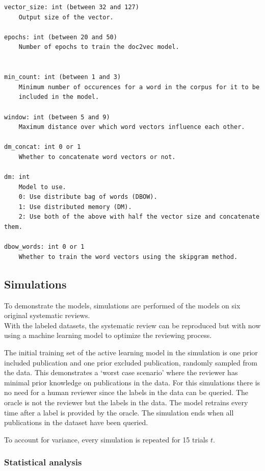 \documentclass[
]{article}
\begin{document}
\begin{verbatim}
vector_size: int (between 32 and 127)
    Output size of the vector.

epochs: int (between 20 and 50)
    Number of epochs to train the doc2vec model.


min_count: int (between 1 and 3)
    Minimum number of occurences for a word in the corpus for it to be 
    included in the model.

window: int (between 5 and 9)
    Maximum distance over which word vectors influence each other.

dm_concat: int 0 or 1
    Whether to concatenate word vectors or not.
                 
dm: int 
    Model to use.
    0: Use distribute bag of words (DBOW).
    1: Use distributed memory (DM).
    2: Use both of the above with half the vector size and concatenate them.

dbow_words: int 0 or 1
    Whether to train the word vectors using the skipgram method.
\end{verbatim}

\hypertarget{simulations}{%
\subsection{Simulations}\label{simulations}}

To demonstrate the models, simulations are performed of the models on
six original systematic reviews.\\
With the labeled datasets, the systematic review can be reproduced but
with now using a machine learning model to optimize the reviewing
process.

The initial training set of the active learning model in the simulation
is one prior included publication and one prior excluded publication,
randomly sampled from the data. This demonstrates a `worst case
scenario' where the reviewer has minimal prior knowledge on publications
in the data. For this simulations there is no need for a human reviewer
since the labels in the data can be queried. The oracle is not the
reviewer but the labels in the data. The model retrains every time after
a label is provided by the oracle. The simulation ends when all
publications in the dataset have been queried.

To account for variance, every simulation is repeated for 15 trials
\(t\).

\hypertarget{statistical-analysis}{%
\subsubsection{Statistical analysis}\label{statistical-analysis}}
\end{document}
